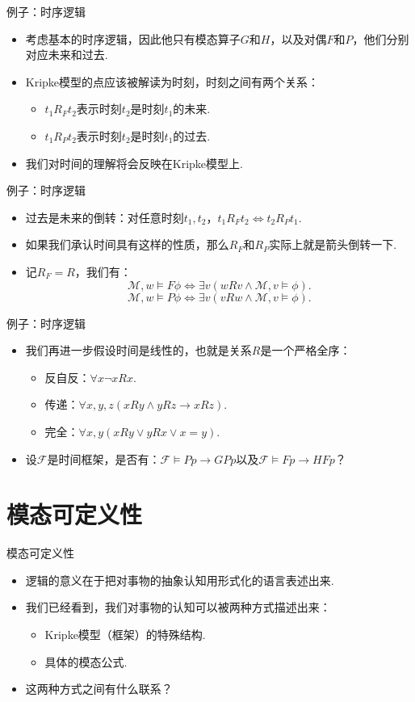     
    {例子：时序逻辑}
    \begin{itemize}
        \item 考虑基本的时序逻辑，因此他只有模态算子$G$和$H$，以及对偶$F$和$P$，他们分别对应未来和过去.
        \item Kripke模型的点应该被解读为时刻，时刻之间有两个关系：
        \begin{itemize}
            \item $t_1 R_F t_2$表示时刻$t_2$是时刻$t_1$的未来.
            \item $t_1 R_P t_2$表示时刻$t_2$是时刻$t_1$的过去.
        \end{itemize}
        \item 我们对时间的理解将会反映在Kripke模型上.
    \end{itemize}
    
    
    {例子：时序逻辑}
    \begin{itemize}
        \item 过去是未来的倒转：对任意时刻$t_1,t_2$，$t_1 R_F t_2\iff t_2 R_P t_1$.
        \item 如果我们承认时间具有这样的性质，那么$R_F$和$R_P$实际上就是箭头倒转一下.
        \item 记$R_F=R$，我们有：
        \[\mathcal M,w\vDash F\phi\iff\exists v(wRv\wedge\mathcal M,v\vDash \phi).\]
        \[\mathcal M,w\vDash P\phi\iff\exists v(vRw\wedge\mathcal M,v\vDash \phi).\]
    \end{itemize}
    
    
    {例子：时序逻辑}
    \begin{itemize}
        \item 我们再进一步假设时间是线性的，也就是关系$R$是一个严格全序：
        \begin{itemize}
            \item 反自反：$\forall x\neg xRx$.
            \item 传递：$\forall x,y,z(xRy\wedge yRz\to xRz)$.
            \item 完全：$\forall x,y(xRy\vee yRx\vee x=y)$.
        \end{itemize}
        \item 设$\mathcal F$是时间框架，是否有：$\mathcal F\vDash Pp\to GP p$以及$\mathcal F\vDash Fp\to HF p$？
    \end{itemize}
    
    
    \section{模态可定义性}
    {模态可定义性}
    \begin{itemize}
        \item 逻辑的意义在于把对事物的抽象认知用形式化的语言表述出来.
        \item 我们已经看到，我们对事物的认知可以被两种方式描述出来：
        \begin{itemize}
            \item Kripke模型（框架）的特殊结构.
            \item 具体的模态公式.
        \end{itemize}
        \item 这两种方式之间有什么联系？
    \end{itemize}
    
